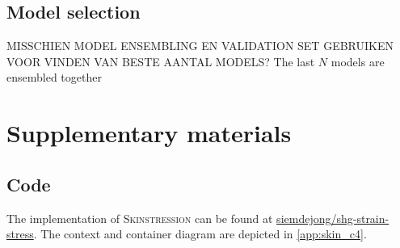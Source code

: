 \subsection{Model selection}
MISSCHIEN MODEL ENSEMBLING EN VALIDATION SET GEBRUIKEN VOOR VINDEN VAN BESTE AANTAL MODELS?
The last $N$ models are ensembled together

\section{Supplementary materials}
\subsection{Code}
The implementation of \textsc{Skinstression} can be found at \href{https://github.io/siemdejong/shg-strain-stress}{ siemdejong/shg-strain-stress}.
The context and container diagram are depicted in \cref{app:skin_c4}.